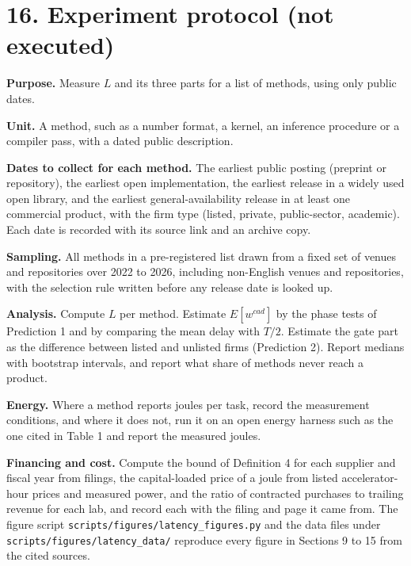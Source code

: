 \documentclass[10pt,letterpaper]{article}
\begin{document}
\section{16. Experiment protocol (not
executed)}\label{experiment-protocol-not-executed}

\textbf{Purpose.} Measure \(L\) and its three parts for a list of
methods, using only public dates.

\textbf{Unit.} A method, such as a number format, a kernel, an inference
procedure or a compiler pass, with a dated public description.

\textbf{Dates to collect for each method.} The earliest public posting
(preprint or repository), the earliest open implementation, the earliest
release in a widely used open library, and the earliest
general-availability release in at least one commercial product, with
the firm type (listed, private, public-sector, academic). Each date is
recorded with its source link and an archive copy.

\textbf{Sampling.} All methods in a pre-registered list drawn from a
fixed set of venues and repositories over 2022 to 2026, including
non-English venues and repositories, with the selection rule written
before any release date is looked up.

\textbf{Analysis.} Compute \(L\) per method. Estimate \(E[w^{cad}]\) by
the phase tests of Prediction 1 and by comparing the mean delay with
\(T/2\). Estimate the gate part as the difference between listed and
unlisted firms (Prediction 2). Report medians with bootstrap intervals,
and report what share of methods never reach a product.

\textbf{Energy.} Where a method reports joules per task, record the
measurement conditions, and where it does not, run it on an open energy
harness such as the one cited in Table 1 and report the measured joules.

\textbf{Financing and cost.} Compute the bound of Definition 4 for each
supplier and fiscal year from filings, the capital-loaded price of a
joule from listed accelerator-hour prices and measured power, and the
ratio of contracted purchases to trailing revenue for each lab, and
record each with the filing and page it came from. The figure script
\texttt{scripts/\allowbreak{}figures/\allowbreak{}latency\_\allowbreak{}figures.\allowbreak{}py} and the data files under
\texttt{scripts/\allowbreak{}figures/\allowbreak{}latency\_\allowbreak{}data/\allowbreak{}} reproduce every figure in
Sections 9 to 15 from the cited sources.
\end{document}
